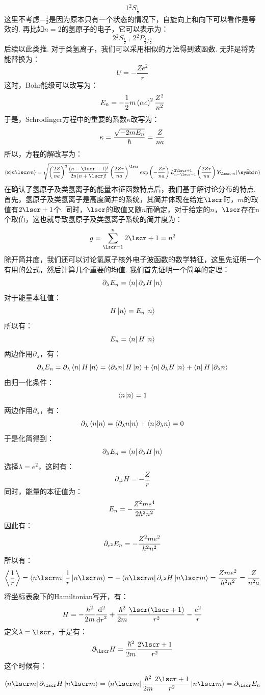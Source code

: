 \[
1{^{2}}S_{\frac{1}{2}}
\]
这里不考虑\(-\frac{1}{2}\)是因为原本只有一个状态的情况下，自旋向上和向下可以看作是等效的. 再比如\(n=2\)的氢原子的电子，它可以表示为：
\[
2{^{2}{S}}_{\frac{1}{2}}\ , \ 2{^{2}{P}_{\frac{1}{2}/\frac{3}{2}}}
\]
后续以此类推. 对于类氢离子，我们可以采用相似的方法得到波函数. 无非是将势能替换为：
\[
U = -\frac{Ze^{2}}{r}
\]
这时，Bohr能级可以改写为：
\[
E_{n} = -\frac{1}{2}m\left({\alpha c}\right)^{2}\frac{Z^{2}}{n^{2}}
\]
于是，Schrodinger方程中的重要的系数\(\kappa\)改写为：
\[
\kappa = \frac{\sqrt{-2mE_{n}}}{\hbar} = \frac{Z}{na}
\]
所以，方程的解改写为：
\[
\bra{\vr}\ket{n\lscr m} = \sqrt{\br{\frac{2Z}{na}}^{3}\frac{(n-\lscr-1)!}{2n(n+\lscr)!}}\br{\frac{2Zr}{na}}^{\lscr}\exp\br{-\frac{Zr}{na}}L_{n-\lscr-1}^{2\lscr+1}\br{\frac{2Zr}{na}}Y_{\lscr,m}(\uv{n})
\]
在确认了氢原子及类氢离子的能量本征函数特点后，我们基于解讨论分布的特点. 首先，氢原子及类氢离子是高度简并的系统，其简并体现在给定\(\lscr\)时，\(m\)的取值有\(2\lscr+1\)个. 
同时，\(\lscr\)的取值又随\(n\)而确定，对于给定的\(n\)，\(\lscr\)存在n个取值，这也就导致氢原子及类氢离子系统的简并度为：
\[
g = \sum_{\lscr = 1}^{n}2\lscr+1 = n^{2}
\]
除开简并度，我们还可以讨论氢原子核外电子波函数的数学特征，这里先证明一个有用的公式，然后计算几个重要的均值. 我们首先证明一个简单的定理：
\[
\partial_{\lambda}E_{n} = \bra{n}\partial_{\lambda}H\ket{n}
\]
对于能量本征值：
\[
H\ket{n} = E_{n}\ket{n}
\]
所以有：
\[
E_{n} = \bra{n}H\ket{n}
\]
两边作用\(\partial_{\lambda}\)，有：
\[
\partial_{\lambda}E_{n} = \partial_{\lambda}\bra{n}H\ket{n} = \bra{\partial_{\lambda}n}H\ket{n} + \bra{n}\partial_{\lambda}H\ket{n} + \bra{n}H\ket{\partial_{\lambda}n}
\]
由归一化条件：
\[
\bra{n}\ket{n} = 1
\]
两边作用\(\partial_{\lambda}\)，有：
\[
\partial_{\lambda}\bra{n}\ket{n} = \bra{\partial_{\lambda}n}\ket{n} + \bra{n}\ket{\partial_{\lambda}n} = 0 
\]
于是化简得到：
\[
\partial_{\lambda}E_{n} = \bra{n}\partial_{\lambda}H\ket{n}
\]
选择\(\lambda=e^{2}\)，这时有：
\[
\partial_{e^{2}}H = -\frac{Z}{r}
\]
同时，能量的本征值为：
\[
E_{n} = -\frac{Z^{2}me^{4}}{2\hbar^{2}n^{2}}
\]
因此有：
\[
\partial_{e^{2}}E_{n} = -\frac{Z^{2}me^{2}}{\hbar^{2}n^{2}}
\]
所以有：
\[
\avg{\frac{1}{r}} = \bra{n\lscr m}\frac{1}{r}\ket{n\lscr m} = -\bra{n\lscr m}\partial_{e^{2}}H\ket{n\lscr m} = \frac{Zme^{2}}{\hh^{2}n^{2}}=\frac{Z}{n^{2}a}
\]
将坐标表象下的Hamiltonian写开，有：
\[
H = -\frac{\hh^{2}}{2m}\dde{}{r} + \frac{\hh^{2}}{2m}\frac{\lscr(\lscr+1)}{r^{2}} - \frac{e^{2}}{r}
\]
定义\(\lambda=\lscr\)，于是有：
\[
\partial_{\lscr}H = \frac{\hh^{2}}{2m}\frac{2\lscr+1}{r^{2}}
\]
这个时候有：
\[
\bra{n\lscr m}\partial_{\lscr}H\ket{n\lscr m} = \bra{n\lscr m}\frac{\hh^{2}}{2m}\frac{2\lscr+1}{r^{2}}\ket{n\lscr m} = \partial_{\lscr}E_{n}
\]
